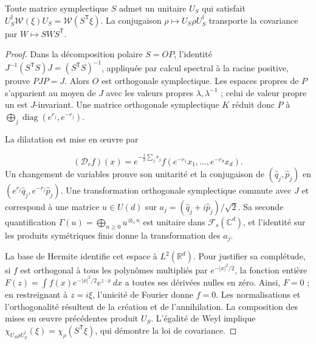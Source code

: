\begin{lemma}
\label{md:antmem:gauss:lem:implementacion-simplectica}
Toute matrice symplectique \(S\) admet un unitaire \(U_S\) qui satisfait
\(U_S^\dagger\mathcal W(\xi)U_S=\mathcal W(S^{\mathsf T}\xi)\).
La conjugaison \(\rho\mapsto U_S\rho U_S^\dagger\) transporte
la covariance par \(W\mapsto SWS^{\mathsf T}\).
\end{lemma}
\begin{proof}
Dans la décomposition polaire \(S=OP\), l’identité
\(J^{-1}(S^{\mathsf T}S)J=(S^{\mathsf T}S)^{-1}\), appliquée par
calcul spectral à la racine positive, prouve \(PJP=J\).
Alors \(O\) est orthogonale symplectique. Les espaces propres de \(P\)
s’apparient au moyen de \(J\) avec les valeurs propres \(\lambda,\lambda^{-1}\) ;
celui de valeur propre un est \(J\)-invariant. Une matrice
orthogonale symplectique \(K\) réduit donc \(P\) à
\(\bigoplus_j\operatorname{diag}(e^{r_j},e^{-r_j})\).

La dilatation est mise en œuvre par

\[
 (\mathcal D_rf)(x)=e^{-\frac12\sum_jr_j}
 f(e^{-r_1}x_1,\ldots,e^{-r_d}x_d).
\]
Un changement de variables prouve son unitarité et la conjugaison de
\((\widehat q_j,\widehat p_j)\) en
\((e^{r_j}\widehat q_j,e^{-r_j}\widehat p_j)\).
Une transformation orthogonale symplectique commute avec \(J\) et
correspond à une matrice \(u\in U(d)\) sur
\(a_j=(\widehat q_j+i\widehat p_j)/\sqrt2\). Sa seconde
quantification \(\Gamma(u)=\bigoplus_{n\geq0}u^{\otimes_s n}\)
est unitaire dans \(\mathcal F_s(\mathbb C^d)\), et l’identité sur les
produits symétriques finis donne la transformation des \(a_j\).

La base de Hermite identifie cet espace à \(L^2(\mathbb R^d)\).
Pour justifier sa complétude, si \(f\) est orthogonal à tous les
polynômes multipliés par \(e^{-|x|^2/2}\), la fonction entière
\(F(z)=\int f(x)e^{-|x|^2/2}e^{z\cdot x}\,dx\) a toutes
ses dérivées nulles en zéro. Ainsi, \(F=0\) ; en restreignant à
\(z=i\xi\), l’unicité de Fourier donne \(f=0\). Les
normalisations et l’orthogonalité résultent de la création et de l’annihilation.
La composition des mises en œuvre précédentes produit \(U_S\).
L’égalité de Weyl implique
\(\chi_{U_S\rho U_S^\dagger}(\xi)=\chi_\rho(S^{\mathsf T}\xi)\),
qui démontre la loi de covariance.

\end{proof}

